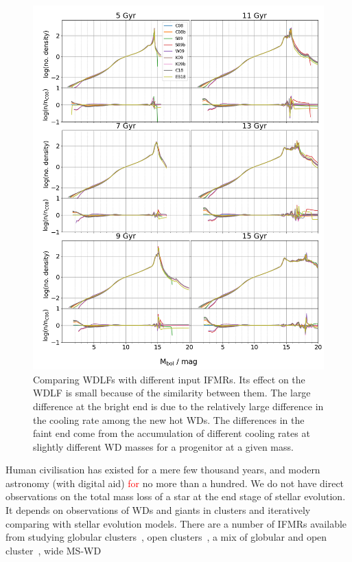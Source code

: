 \documentclass[fleqn,usenatbib]{rasti}
\begin{document}
\begin{figure}
    \centering
    \includegraphics[width=\textwidth]{fig_10_wdlf_compare_ifmr.png}
    \caption{Comparing WDLFs with different input IFMRs. Its effect on the WDLF
    is small because of the similarity between them. The large difference at
    the bright end is due to the relatively large difference in the cooling
    rate among the new hot WDs. The differences in the faint end come from the
    accumulation of different cooling rates at slightly different WD masses for
    a progenitor at a given mass.}
    \label{fig:wdlf_compare_ifmr}
\end{figure}

Human civilisation has existed for a mere few thousand years, and modern
astronomy (with digital aid) \textcolor{red}{for} no more than a hundred. We
do not have direct observations on the total mass loss of a star at the end
stage of stellar evolution. It depends on observations of WDs and giants in
clusters and iteratively comparing with stellar evolution models. There are a
number of IFMRs available from studying globular
clusters~\citep{2004A&A...420..515M, 2009ApJ...705..408K}, open
clusters~\citep{2009ApJ...693..355W, 2016ApJ...818...84C}, a mix of globular
and open cluster~\citep{2018ApJ...866...21C}, wide MS-WD
\end{document}
